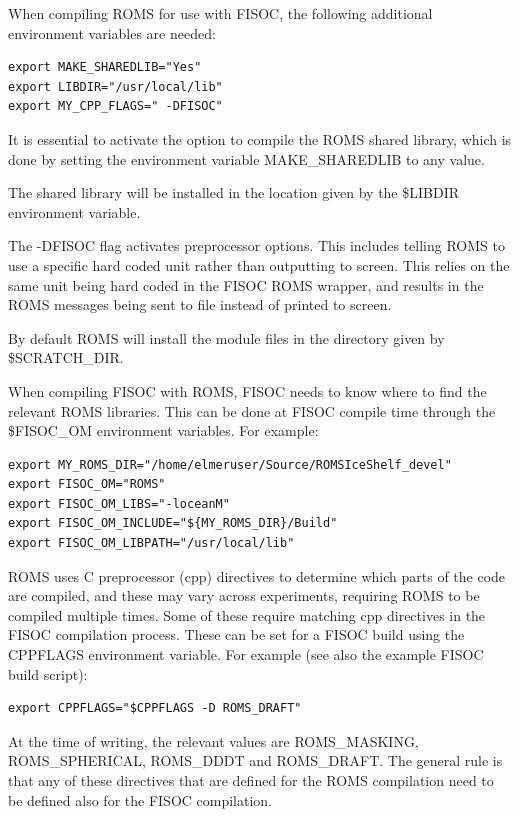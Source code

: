 \documentclass[12pt]{article}
\begin{document}
When compiling ROMS for use with FISOC, the following additional environment
variables are needed:
\begin{lstlisting}
export MAKE_SHAREDLIB="Yes"
export LIBDIR="/usr/local/lib"
export MY_CPP_FLAGS=" -DFISOC"
\end{lstlisting}

It is essential to activate the option to compile the ROMS shared library, which 
is done by setting the environment variable MAKE\_SHAREDLIB to any value. 

The shared library will be installed in the location given by the 
 \$LIBDIR environment variable. 

The -DFISOC flag activates preprocessor options.  This includes telling ROMS to use a 
specific hard coded unit rather than outputting to screen.  This relies on the 
same unit being hard coded in the FISOC ROMS wrapper, and results in the ROMS 
messages being sent to file instead of printed to screen.

By default ROMS will install the module files in the directory given by 
 \$SCRATCH\_DIR.  

When compiling FISOC with ROMS, FISOC needs to know where to 
find the relevant ROMS libraries.  
This can be done at FISOC compile time through the 
\$FISOC\_OM
environment variables.  For example:

\begin{lstlisting}
export MY_ROMS_DIR="/home/elmeruser/Source/ROMSIceShelf_devel"
export FISOC_OM="ROMS"
export FISOC_OM_LIBS="-loceanM"
export FISOC_OM_INCLUDE="${MY_ROMS_DIR}/Build"
export FISOC_OM_LIBPATH="/usr/local/lib"
\end{lstlisting}

ROMS uses C preprocessor (cpp) directives to determine which parts of the code are compiled, 
and these may vary across experiments, requiring ROMS to be compiled multiple times. 
Some of these require matching cpp directives in the FISOC compilation process. 
These can be set for a FISOC build using the CPPFLAGS environment variable.
For example (see also the example FISOC build script):
\begin{lstlisting}
export CPPFLAGS="$CPPFLAGS -D ROMS_DRAFT"
\end{lstlisting}
At the time of writing, the relevant values are ROMS\_MASKING, ROMS\_SPHERICAL, 
ROMS\_DDDT and ROMS\_DRAFT.  The general rule is that any of these directives that 
are defined for the ROMS compilation need to be defined also for the FISOC 
compilation. 
\end{document}
